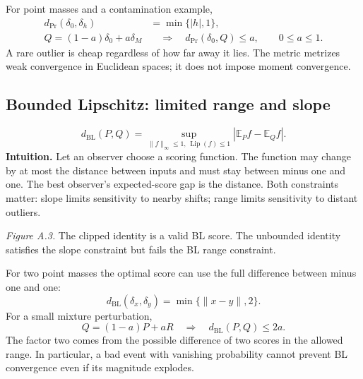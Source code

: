 \documentclass[12pt]{article}
\newcommand{\E}{\mathbb E}
\DeclareMathOperator{\Lip}{Lip}
\begin{document}
For point masses and a contamination example,
\begin{align}
 d_{\mathrm{Pr}}(\delta_0,\delta_h)&=\min\{|h|,1\},\\
 Q=(1-a)\delta_0+a\delta_M
 &\quad\Longrightarrow\quad d_{\mathrm{Pr}}(\delta_0,Q)\le a,
 \qquad 0\le a\le1.
\end{align}
A rare outlier is cheap regardless of how far away it lies. The metric
metrizes weak convergence in Euclidean spaces; it does not impose moment
convergence.

\clearpage
\subsection{Bounded Lipschitz: limited range and slope}\label{sec:bl}
\begin{equation}
 d_{\mathrm{BL}}(P,Q)=
 \sup_{\|f\|_\infty\le1,\,\Lip(f)\le1}|\E_P f-\E_Q f|.
\end{equation}
\textbf{Intuition.} Let an observer choose a scoring function. The function
may change by at most the distance between inputs and must stay between
minus one and one. The best observer's expected-score gap is the distance.
Both constraints matter: slope limits sensitivity to nearby shifts; range
limits sensitivity to distant outliers.

\begin{center}
\end{center}
\textit{Figure A.3.} The clipped identity is a valid BL score. The unbounded
identity satisfies the slope constraint but fails the BL range constraint.

For two point masses the optimal score can use the full difference between
minus one and one:
\begin{equation}
 d_{\mathrm{BL}}(\delta_x,\delta_y)=\min\{\|x-y\|,2\}.
\end{equation}
For a small mixture perturbation,
\begin{equation}
 Q=(1-a)P+aR
 \quad\Longrightarrow\quad d_{\mathrm{BL}}(P,Q)\le2a.
\end{equation}
The factor two comes from the possible difference of two scores in the
allowed range. In particular, a bad event with vanishing probability
cannot prevent BL convergence even if its magnitude explodes.
\end{document}
